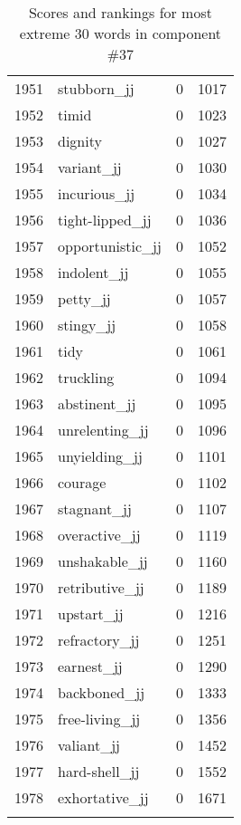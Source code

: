 \begin{longtable}[!htbp]{| rlr@{.}l |}
    1951 & stubborn\_jj & 0 & 1017 \\
    1952 & timid & 0 & 1023 \\
    1953 & dignity & 0 & 1027 \\
    1954 & variant\_jj & 0 & 1030 \\
    1955 & incurious\_jj & 0 & 1034 \\
    1956 & tight-lipped\_jj & 0 & 1036 \\
    1957 & opportunistic\_jj & 0 & 1052 \\
    1958 & indolent\_jj & 0 & 1055 \\
    1959 & petty\_jj & 0 & 1057 \\
    1960 & stingy\_jj & 0 & 1058 \\
    1961 & tidy & 0 & 1061 \\
    1962 & truckling & 0 & 1094 \\
    1963 & abstinent\_jj & 0 & 1095 \\
    1964 & unrelenting\_jj & 0 & 1096 \\
    1965 & unyielding\_jj & 0 & 1101 \\
    1966 & courage & 0 & 1102 \\
    1967 & stagnant\_jj & 0 & 1107 \\
    1968 & overactive\_jj & 0 & 1119 \\
    1969 & unshakable\_jj & 0 & 1160 \\
    1970 & retributive\_jj & 0 & 1189 \\
    1971 & upstart\_jj & 0 & 1216 \\
    1972 & refractory\_jj & 0 & 1251 \\
    1973 & earnest\_jj & 0 & 1290 \\
    1974 & backboned\_jj & 0 & 1333 \\
    1975 & free-living\_jj & 0 & 1356 \\
    1976 & valiant\_jj & 0 & 1452 \\
    1977 & hard-shell\_jj & 0 & 1552 \\
    1978 & exhortative\_jj & 0 & 1671 \\
    \hline
    \caption{Scores and rankings for most extreme 30 words in component \#37} \\
\end{longtable}
